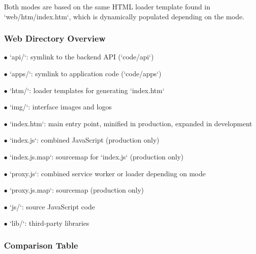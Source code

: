 \documentclass[a4paper]{article}
\begin{document}
Both modes are based on the same HTML loader template found in `web/htm/index.htm`, which is dynamically populated depending on the mode.

\hypertarget{toc46}{}
\subsubsection{Web Directory Overview}

\begin{compactitem}
\item[\color{myblue}$\bullet$] `api/`: symlink to the backend API (`code/api`)
\item[\color{myblue}$\bullet$] `apps/`: symlink to application code (`code/apps`)
\item[\color{myblue}$\bullet$] `htm/`: loader templates for generating `index.htm`
\item[\color{myblue}$\bullet$] `img/`: interface images and logos
\item[\color{myblue}$\bullet$] `index.htm`: main entry point, minified in production, expanded in development
\item[\color{myblue}$\bullet$] `index.js`: combined JavaScript (production only)
\item[\color{myblue}$\bullet$] `index.js.map`: sourcemap for `index.js` (production only)
\item[\color{myblue}$\bullet$] `proxy.js`: combined service worker or loader depending on mode
\item[\color{myblue}$\bullet$] `proxy.js.map`: sourcemap (production only)
\item[\color{myblue}$\bullet$] `js/`: source JavaScript code
\item[\color{myblue}$\bullet$] `lib/`: third-party libraries
\end{compactitem}

\hypertarget{toc47}{}
\subsubsection{Comparison Table}
\end{document}
